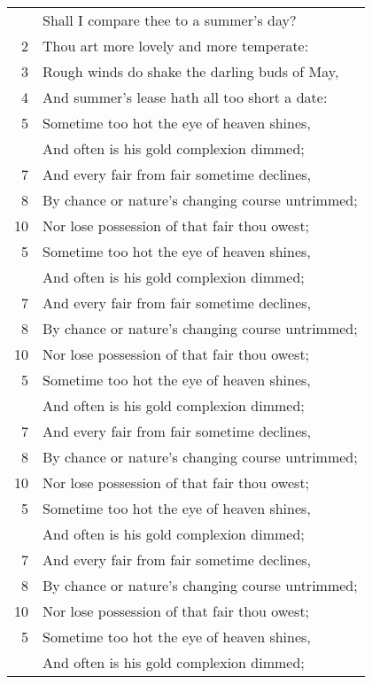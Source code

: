 \documentclass[paper=6in:9in,pagesize=pdftex,
               headinclude=on,footinclude=on,12pt]{scrbook}
\begin{document}

\begin{longtable}[p]{ r l }
 & Shall I compare thee to a summer's day? \\
2 & Thou art more lovely and more temperate: \\
3 & Rough winds do shake the darling buds of May, \\
4 & And summer's lease hath all too short a date: \\
5 & Sometime too hot the eye of heaven shines, \\
 & And often is his gold complexion dimmed; \\
7 & And every fair from fair sometime declines, \\
8 & By chance or nature's changing course untrimmed; \\
10 & Nor lose possession of that fair thou owest; \\
5 & Sometime too hot the eye of heaven shines, \\
 & And often is his gold complexion dimmed; \\
7 & And every fair from fair sometime declines, \\
8 & By chance or nature's changing course untrimmed; \\
10 & Nor lose possession of that fair thou owest; \\
5 & Sometime too hot the eye of heaven shines, \\
 & And often is his gold complexion dimmed; \\
7 & And every fair from fair sometime declines, \\
8 & By chance or nature's changing course untrimmed; \\
10 & Nor lose possession of that fair thou owest; \\
5 & Sometime too hot the eye of heaven shines, \\
 & And often is his gold complexion dimmed; \\
7 & And every fair from fair sometime declines, \\
8 & By chance or nature's changing course untrimmed; \\
10 & Nor lose possession of that fair thou owest; \\
5 & Sometime too hot the eye of heaven shines, \\
 & And often is his gold complexion dimmed; \\

\end{longtable}
\end{document}
